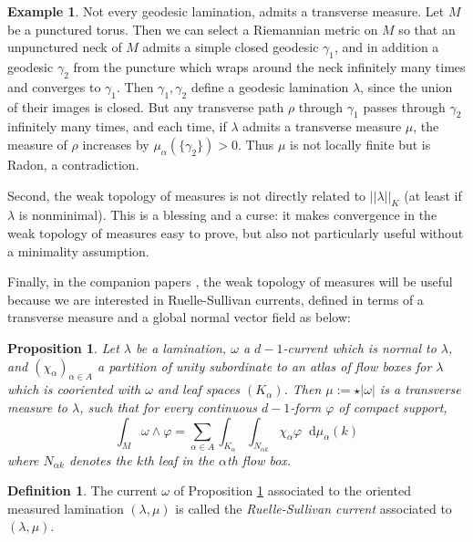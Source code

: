 \documentclass[reqno,10pt]{amsart}
\newcommand*\dif{\mathop{}\!\mathrm{d}}
\newcommand{\dfn}[1]{\emph{#1}\index{#1}}
\newtheorem{proposition}[theorem]{Proposition}
\theoremstyle{definition}
\newtheorem{definition}[theorem]{Definition}
\newtheorem{example}[theorem]{Example}
\numberwithin{equation}{section}
\begin{document}
\begin{example}
Not every geodesic lamination, admits a transverse measure.
Let $M$ be a punctured torus.
Then we can select a Riemannian metric on $M$ so that an unpunctured neck of $M$ admits a simple closed geodesic $\gamma_1$, and in addition a geodesic $\gamma_2$ from the puncture which wraps around the neck infinitely many times and converges to $\gamma_1$.
Then $\gamma_1, \gamma_2$ define a geodesic lamination $\lambda$, since the union of their images is closed.
But any transverse path $\rho$ through $\gamma_1$ passes through $\gamma_2$ infinitely many times, and each time, if $\lambda$ admits a transverse measure $\mu$, the measure of $\rho$ increases by $\mu_\alpha(\{\gamma_2\}) > 0$.
Thus $\mu$ is not locally finite but is Radon, a contradiction.
\end{example}

Second, the weak topology of measures is not directly related to $||\lambda||_K$ (at least if $\lambda$ is nonminimal).
This is a blessing and a curse: it makes convergence in the weak topology of measures easy to prove, but also not particularly useful without a minimality assumption.

Finally, in the companion papers \cite{BackusFLG, DaskalopoulosPrep2}, the weak topology of measures will be useful because we are interested in Ruelle-Sullivan currents, defined in terms of a transverse measure and a global normal vector field as below:

\begin{proposition}\label{construction of ruelle sullivan currents}
Let $\lambda$ be a lamination, $\omega$ a $d-1$-current which is normal to $\lambda$, and $(\chi_\alpha)_{\alpha \in A}$ a partition of unity subordinate to an atlas of flow boxes for $\lambda$ which is cooriented with $\omega$ and leaf spaces $(K_\alpha)$.
Then $\mu := \star |\omega|$ is a transverse measure to $\lambda$, such that for every continuous $d-1$-form $\varphi$ of compact support,
$$\int_M \omega \wedge \varphi = \sum_{\alpha \in A} \int_{K_\alpha} \int_{N_{\alpha k}} \chi_\alpha \varphi \dif \mu_\alpha(k)$$
where $N_{\alpha k}$ denotes the $k$th leaf in the $\alpha$th flow box.
\end{proposition}

\begin{definition}
The current $\omega$ of Proposition \ref{construction of ruelle sullivan currents} associated to the oriented measured lamination $(\lambda, \mu)$ is called the \dfn{Ruelle-Sullivan current} associated to $(\lambda, \mu)$.
\end{definition}
\end{document}
